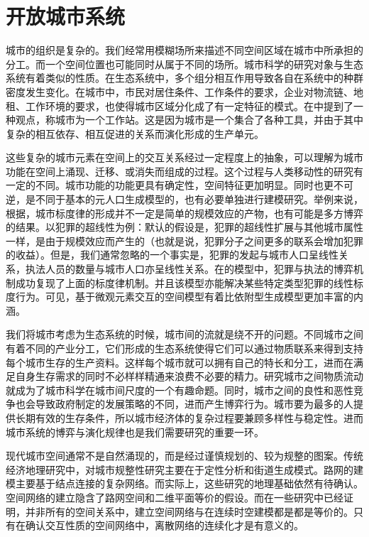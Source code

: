 \chapter{开放城市系统}

城市的组织是复杂的。我们经常用模糊场所来描述不同空间区域在城市中所承担的分工。而一个空间位置也可能同时从属于不同的场所。城市科学的研究对象与生态系统有着类似的性质。在生态系统中，多个组分相互作用导致各自在系统中的种群密度发生变化。在城市中，市民对居住条件、工作条件的要求，企业对物流链、地租、工作环境的要求，也使得城市区域分化成了有一定特征的模式。在\cite{christopherson1986city}中提到了一种观点，称城市为一个工作站。这是因为城市是一个集合了各种工具，并由于其中复杂的相互依存、相互促进的关系而演化形成的生产单元。

这些复杂的城市元素在空间上的交互关系经过一定程度上的抽象，可以理解为城市功能在空间上涌现、迁移、或消失而组成的过程。这个过程与人类移动性\cite{molas2017field,gonzalez2008understanding,song2010limits,song2010modelling}的研究有一定的不同。城市功能的功能更具有确定性，空间特征更加明显。同时也更不可逆，是不同于基本的元人口生成模型的，也有必要单独进行建模研究。举例来说，根据\cite{banerjee2015competitive}，城市标度律的形成并不一定是简单的规模效应的产物，也有可能是多方博弈的结果。以犯罪的超线性为例：默认的假设是，犯罪的超线性扩展与其他城市属性一样，是由于规模效应而产生的（也就是说，犯罪分子之间更多的联系会增加犯罪的收益）。但是，我们通常忽略的一个事实是，犯罪的发起与城市人口呈线性关系，执法人员的数量与城市人口亦呈线性关系。在\cite{banerjee2015competitive}的模型中，犯罪与执法的博弈机制成功复现了上面的标度律机制。并且该模型亦能解决某些特定类型犯罪的线性标度行为。可见，基于微观元素交互的空间模型有着比依附型生成模型更加丰富的内涵。

我们将城市考虑为生态系统的时候，城市间的流就是绕不开的问题。不同城市之间有着不同的产业分工，它们形成的生态系统使得它们可以通过物质联系来得到支持每个城市生存的生产资料。这样每个城市就可以拥有自己的特长和分工，进而在满足自身生存需求的同时不必样样精通来浪费不必要的精力。研究城市之间物质流动就成为了城市科学在城市间尺度的一个有趣命题。同时，城市之间的良性和恶性竞争也会导致政府制定的发展策略的不同，进而产生博弈行为。城市要为最多的人提供长期有效的生存条件，所以城市经济体的复杂过程要兼顾多样性与稳定性。进而城市系统的博弈与演化规律也是我们需要研究的重要一环。

现代城市空间通常不是自然涌现的，而是经过谨慎规划的、较为规整的图案。传统经济地理研究中，对城市规整性研究主要在于定性分析\cite{colonna2002proposal}和街道生成模式\cite{barthelemy2008modeling}。路网的建模主要基于结点连接的复杂网络。而实际上，这些研究的地理基础依然有待确认。空间网络的建立隐含了路网空间和二维平面等价的假设。而在一些研究中\cite{DURRETT1994363}已经证明，并非所有的空间关系中，建立空间网络与在连续时空建模都是都是等价的。只有在确认交互性质的空间网络中，离散网络的连续化才是有意义的。

